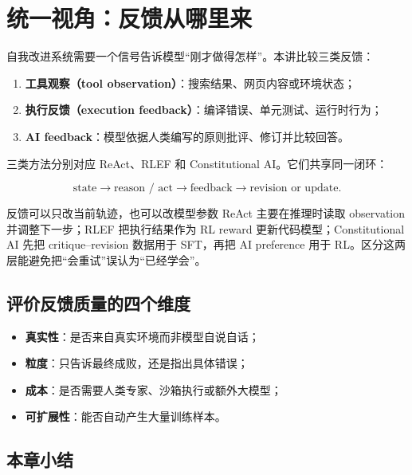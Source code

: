 \documentclass[a4paper]{article}
\begin{document}
\makelecturetitle

\section{统一视角：反馈从哪里来}

自我改进系统需要一个信号告诉模型“刚才做得怎样”。本讲比较三类反馈：

\begin{enumerate}
    \item \textbf{工具观察（tool observation）}：搜索结果、网页内容或环境状态；
    \item \textbf{执行反馈（execution feedback）}：编译错误、单元测试、运行时行为；
    \item \textbf{AI feedback}：模型依据人类编写的原则批评、修订并比较回答。
\end{enumerate}


三类方法分别对应 ReAct、RLEF 和 Constitutional AI。它们共享同一闭环：

$$
\text{state}\rightarrow\text{reason / act}\rightarrow\text{feedback}
\rightarrow\text{revision or update}.
$$

\begin{importantbox}{反馈可以只改当前轨迹，也可以改模型参数}
ReAct 主要在推理时读取 observation 并调整下一步；RLEF 把执行结果作为 RL reward 更新代码模型；Constitutional AI 先把 critique--revision 数据用于 SFT，再把 AI preference 用于 RL。区分这两层能避免把“会重试”误认为“已经学会”。
\end{importantbox}

\subsection{评价反馈质量的四个维度}

\begin{itemize}
    \item \textbf{真实性}：是否来自真实环境而非模型自说自话；
    \item \textbf{粒度}：只告诉最终成败，还是指出具体错误；
    \item \textbf{成本}：是否需要人类专家、沙箱执行或额外大模型；
    \item \textbf{可扩展性}：能否自动产生大量训练样本。
\end{itemize}

\subsection{本章小结}
\end{document}
